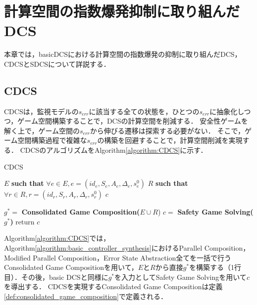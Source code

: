 \section{計算空間の指数爆発抑制に取り組んだDCS}
\label{section:advDCS}
本章では，basicDCSにおける計算空間の指数爆発の抑制に取り組んだDCS，CDCSとSDCSについて詳説する．


\subsection{CDCS}
\label{subsection:CDCS}
CDCS\cite{yamauchi:IPSJ2024}は，監視モデルの$s_{err}$に該当する全ての状態を，ひとつの$s_{err}$に抽象化しつつ，ゲーム空間構築することで，DCSの計算空間を削減する．
安全性ゲームを解く上で，ゲーム空間の$s_{err}$から伸びる遷移は探索する必要がない．
そこで，ゲーム空間構築過程で複雑な$s_{err}$の構築を回避することで，計算空間削減を実現する．
CDCSのアルゴリズムをAlgorithm\ref{algorithm:CDCS}に示す．

\begin{algorithm}[h]
\caption{CDCS}
\label{algorithm:CDCS}
\begin{algorithmic}[1]
\renewcommand{\algorithmicrequire}{\textbf{Input:}}
\renewcommand{\algorithmicensure}{\textbf{Output:}}
\REQUIRE $E$ {\bf such that} $\forall e \in E, e = (id_{e}, S_{e}, A_{e}, \Delta_{e}, s^0_{e})$
\REQUIRE $R$ {\bf such that} $\forall r \in R, r = (id_{r}, S_{r}, A_{r}, \Delta_{r}, s^0_{r})$
\ENSURE  $c$

\STATE $g^* =$ {\bf Consolidated Game Composition($E \cup R$})
\STATE $c   =$ {\bf Safety Game Solving($g^*$)}
\STATE return $c$
\end{algorithmic}
\end{algorithm}

Algorithm\ref{algorithm:CDCS}では，Algorithm\ref{algorithm:basic_controller_synthesis}におけるParallel Composition，Modified Parallel Composition，Error State Abstraction全てを一括で行うConsolidated Game Compositionを用いて，$E$と$R$から直接$g^*$を構築する（1行目）．その後，basic DCSと同様に$g^*$を入力としてSafety Game Solvingを用いて$c$を導出する．
CDCSを実現するConsolidated Game Compositionは定義\ref{def:consolidated_game_composition}で定義される．

